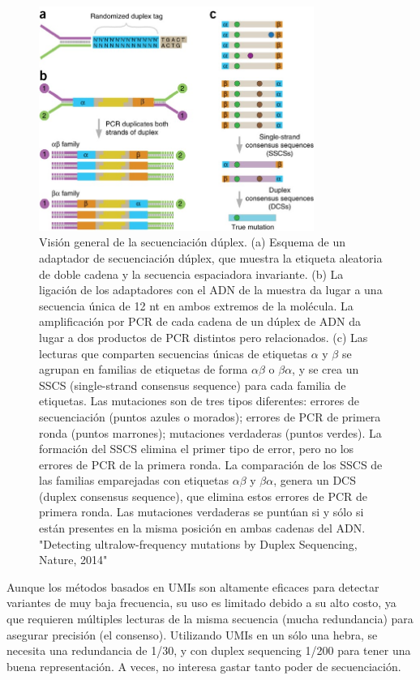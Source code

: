 \begin{figure}[htbp]
\centering
\includegraphics[width = 0.8\textwidth]{figs/duplex-sequencing.jpg}
\caption{Visión general de la secuenciación dúplex. (a) Esquema de un adaptador de secuenciación dúplex, que muestra la etiqueta aleatoria de doble cadena y la secuencia espaciadora invariante. (b) La ligación de los adaptadores con el ADN de la muestra da lugar a una secuencia única de 12 nt en ambos extremos de la molécula. La amplificación por PCR de cada cadena de un dúplex de ADN da lugar a dos productos de PCR distintos pero relacionados. (c) Las lecturas que comparten secuencias únicas de etiquetas $\alpha$ y $\beta$ se agrupan en familias de etiquetas de forma $\alpha \beta$ o $\beta \alpha$, y se crea un SSCS (single-strand consensus sequence) para cada familia de etiquetas. Las mutaciones son de tres tipos diferentes: errores de secuenciación (puntos azules o morados); errores de PCR de primera ronda (puntos marrones); mutaciones verdaderas (puntos verdes). La formación del SSCS elimina el primer tipo de error, pero no los errores de PCR de la primera ronda. La comparación de los SSCS de las familias emparejadas con etiquetas $\alpha \beta$ y $\beta \alpha$, genera un DCS (duplex consensus sequence), que elimina estos errores de PCR de primera ronda. Las mutaciones verdaderas se puntúan si y sólo si están presentes en la misma posición en ambas cadenas del ADN. "Detecting ultralow-frequency mutations by Duplex Sequencing, Nature, 2014"}
\end{figure}

Aunque los métodos basados en UMIs son altamente eficaces para detectar variantes de muy baja frecuencia, su uso es limitado debido a su alto costo, ya que requieren múltiples lecturas de la misma secuencia (mucha redundancia) para asegurar precisión (el consenso). Utilizando UMIs en un sólo una hebra, se necesita una redundancia de 1/30, y con duplex sequencing 1/200 para tener una buena representación. A veces, no interesa gastar tanto poder de secuenciación. 

